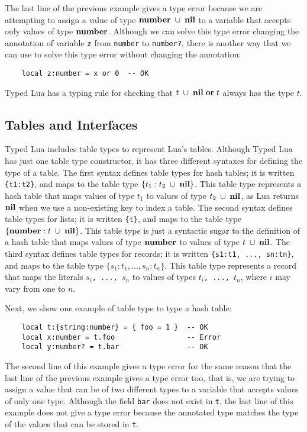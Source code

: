 The last line of the previous example gives a type error because we
are attempting to assign a value of type $\mathbf{number}\;\cup\;\mathbf{nil}$
to a variable that accepts only values of type $\mathbf{number}$.
Although we can solve this type error changing the annotation of
variable \texttt{z} from \texttt{number} to \texttt{number?}, there is
another way that we can use to solve this type error without changing
the annotation:
\begin{verbatim}
    local z:number = x or 0  -- OK
\end{verbatim}

Typed Lua has a typing rule for checking that
$t\;\cup\;\mathbf{nil}\;\mathbf{or}\;t$ always has the type $t$.

\subsection{Tables and Interfaces}

Typed Lua includes table types to represent Lua's tables.
Although Typed Lua has just one table type constructor, it has three
different syntaxes for defining the type of a table.
The first syntax defines table types for hash tables;
it is written \texttt{\{t1:t2\}},
and maps to the table type $\{t_{1}:t_{2}\;\cup\;\mathbf{nil}\}$.
This table type represents a hash table that maps values of type
$t_{1}$ to values of type $t_{2}\;\cup\;\mathbf{nil}$, as Lua returns
$\mathbf{nil}$ when we use a non-existing key to index a table.
The second syntax defines table types for lists;
it is written \texttt{\{t\}},
and maps to the table type $\{\mathbf{number}:t\;\cup\;\mathbf{nil}\}$.
This table type is just a syntactic sugar to the definition of a
hash table that maps values of type $\mathbf{number}$ to values of type
$t\;\cup\;\mathbf{nil}$.
The third syntax defines table types for records;
it is written \texttt{\{s1:t1, ..., sn:tn\}},
and maps to the table type $\{s_{1}:t_{1}, ..., s_{n}:t_{n}\}$.
This table type represents a record that maps the literals
$s_{i}$\texttt{, ..., }$s_{n}$ to values of types
$t_{i}$\texttt{, ..., }$t_{n}$, where $i$ may vary from one to $n$.

Next, we show one example of table type to type a hash table:
\begin{verbatim}
    local t:{string:number} = { foo = 1 }  -- OK
    local x:number = t.foo                 -- Error
    local y:number? = t.bar                -- OK
\end{verbatim}

The second line of this example gives a type error for the same
reason that the last line of the previous example gives a type error
too, that is, we are trying to assign a value that can be of two
different types to a variable that accepts values of only one type.
Although the field \texttt{bar} does not exist in \texttt{t}, the last
line of this example does not give a type error because the
annotated type matches the type of the values that can be stored in
\texttt{t}.

